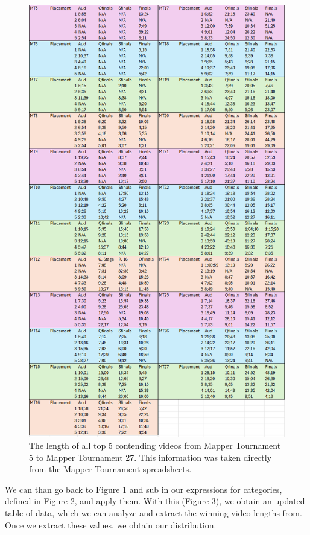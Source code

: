 \documentclass[letterpaper,twocolumn,amsmath,amssymb,prl,nolongbibliography,url,reprint]{revtex4-2}
\begin{document}
\begin{figure}
\includegraphics[width=1\linewidth]{Earlydata.png}
\caption{\label{fg:ret}
The length of all top 5 contending videos from Mapper Tournament 5 to Mapper Tournament 27. This information was taken directly from the Mapper Tournament spreadsheets.}
\end{figure}

We can than go back to Figure 1 and sub in our expressions for categories, defined in Figure 2, and apply them. With this (Figure 3), we obtain an updated table of data, which we can analyze and extract the winning video lengths from. Once we extract these values, we obtain our distribution.
\end{document}
